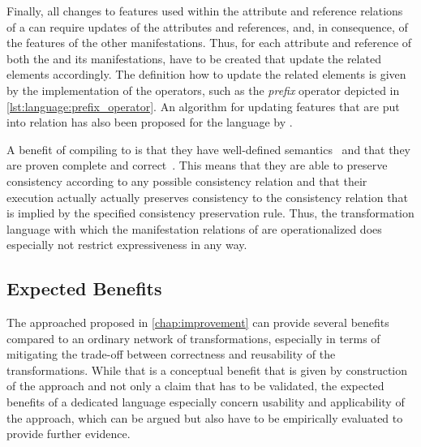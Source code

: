 Finally, all changes to features used within the attribute and reference relations of a \commonality can require updates of the \commonality attributes and references, and, in consequence, of the features of the other manifestations.
Thus, for each attribute and reference of both the \commonality and its manifestations, \reactions have to be created that update the related elements accordingly.
The definition how to update the related elements is given by the implementation of the operators, such as the \emph{prefix} operator depicted in \autoref{lst:language:prefix_operator}.
An algorithm for updating features that are put into relation has also been proposed for the \mappings language by \textcite[Alg. 3]{kramer2017a}.

A benefit of compiling to \reactions is that they have well-defined semantics~\cite[Sec. 6.7]{kramer2017a} and that they are proven complete and correct~\cite[Sec. 9.2.4 and 9.3]{kramer2017a}.
This means that they are able to preserve consistency according to any possible consistency relation and that their execution actually actually preserves consistency to the consistency relation that is implied by the specified consistency preservation rule.
Thus, the transformation language with which the manifestation relations of \commonalities are operationalized does especially not restrict expressiveness in any way.


\subsection{Expected Benefits}
\label{chap:language:commonalities:benefits}

The \commonalities approached proposed in \autoref{chap:improvement} can provide several benefits compared to an ordinary network of transformations, especially in terms of mitigating the trade-off between correctness and reusability of the transformations.
While that is a conceptual benefit that is given by construction of the approach and not only a claim that has to be validated, the expected benefits of a dedicated \commonalities language especially concern usability and applicability of the approach, which can be argued but also have to be empirically evaluated to provide further evidence.

